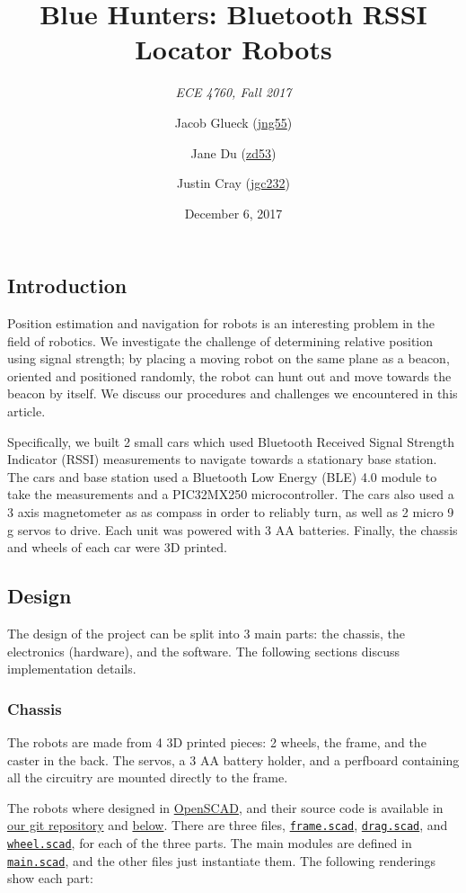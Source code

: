 \documentclass[]{article}
\title{Blue Hunters: Bluetooth RSSI Locator Robots}
\subtitle{\emph{ECE 4760, Fall 2017}}
\author{Jacob Glueck (\href{mailto:jng55@cornell.edu}{jng55}) \and Jane Du (\href{mailto:zd53@cornell.edu}{zd53}) \and Justin Cray (\href{mailto:jgc232@cornell.edu}{jgc232})}
\date{December 6, 2017}
\begin{document}
\maketitle

\hypertarget{introduction}{%
\subsection{Introduction}\label{introduction}}

Position estimation and navigation for robots is an interesting problem
in the field of robotics. We investigate the challenge of determining
relative position using signal strength; by placing a moving robot on
the same plane as a beacon, oriented and positioned randomly, the
robot can hunt out and move towards the beacon by itself. We discuss
our procedures and challenges we encountered in this article.

Specifically, we built 2 small cars which used Bluetooth Received Signal Strength
Indicator (RSSI) measurements to navigate towards a stationary base
station. The cars and base station used a Bluetooth Low Energy (BLE) 4.0
module to take the measurements and a PIC32MX250 microcontroller. The
cars also used a 3 axis magnetometer as as compass in order to reliably
turn, as well as 2 micro 9 g servos to drive. Each unit was powered with
3 AA batteries. Finally, the chassis and wheels of each car were 3D
printed.

\hypertarget{design}{%
\subsection{Design}\label{design}}

The design of the project can be split into 3 main parts: the chassis, the electronics (hardware), and the software. The following sections discuss implementation details.

\hypertarget{chassis}{%
\subsubsection{Chassis}\label{chassis}}

The robots are made from 4 3D printed pieces: 2 wheels, the frame, and
the caster in the back. The servos, a 3 AA battery holder, and a
perfboard containing all the circuitry are mounted directly to the
frame.

The robots where designed in \href{http://www.openscad.org/}{OpenSCAD},
and their source code is available in
\href{https://github.com/orangeturtle739/bluehunters/tree/master/cad}{our
git repository} and
\protect\hyperlink{appendix-b-source-listing}{below}. There are three
files, \href{generated/frame.scad.html}{\texttt{frame.scad}},
\href{generated/drag.scad.html}{\texttt{drag.scad}}, and
\href{generated/wheel.scad.html}{\texttt{wheel.scad}}, for each of the
three parts. The main modules are defined in
\href{generated/main.scad.html}{\texttt{main.scad}}, and the other files
just instantiate them. The following renderings show each part:
\end{document}
